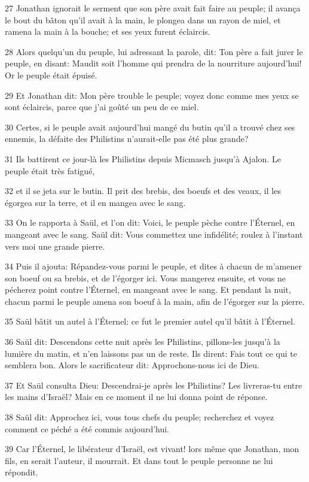 \par 27 Jonathan ignorait le serment que son père avait fait faire au peuple; il avança le bout du bâton qu'il avait à la main, le plongea dans un rayon de miel, et ramena la main à la bouche; et ses yeux furent éclaircis.
\par 28 Alors quelqu'un du peuple, lui adressant la parole, dit: Ton père a fait jurer le peuple, en disant: Maudit soit l'homme qui prendra de la nourriture aujourd'hui! Or le peuple était épuisé.
\par 29 Et Jonathan dit: Mon père trouble le peuple; voyez donc comme mes yeux se sont éclaircis, parce que j'ai goûté un peu de ce miel.
\par 30 Certes, si le peuple avait aujourd'hui mangé du butin qu'il a trouvé chez ses ennemis, la défaite des Philistins n'aurait-elle pas été plus grande?
\par 31 Ils battirent ce jour-là les Philistins depuis Micmasch jusqu'à Ajalon. Le peuple était très fatigué,
\par 32 et il se jeta sur le butin. Il prit des brebis, des boeufs et des veaux, il les égorgea sur la terre, et il en mangea avec le sang.
\par 33 On le rapporta à Saül, et l'on dit: Voici, le peuple pèche contre l'Éternel, en mangeant avec le sang. Saül dit: Vous commettez une infidélité; roulez à l'instant vers moi une grande pierre.
\par 34 Puis il ajouta: Répandez-vous parmi le peuple, et dites à chacun de m'amener son boeuf ou sa brebis, et de l'égorger ici. Vous mangerez ensuite, et vous ne pécherez point contre l'Éternel, en mangeant avec le sang. Et pendant la nuit, chacun parmi le peuple amena son boeuf à la main, afin de l'égorger sur la pierre.
\par 35 Saül bâtit un autel à l'Éternel: ce fut le premier autel qu'il bâtit à l'Éternel.
\par 36 Saül dit: Descendons cette nuit après les Philistins, pillons-les jusqu'à la lumière du matin, et n'en laissons pas un de reste. Ils dirent: Fais tout ce qui te semblera bon. Alors le sacrificateur dit: Approchons-nous ici de Dieu.
\par 37 Et Saül consulta Dieu: Descendrai-je après les Philistins? Les livreras-tu entre les mains d'Israël? Mais en ce moment il ne lui donna point de réponse.
\par 38 Saül dit: Approchez ici, vous tous chefs du peuple; recherchez et voyez comment ce péché a été commis aujourd'hui.
\par 39 Car l'Éternel, le libérateur d'Israël, est vivant! lors même que Jonathan, mon fils, en serait l'auteur, il mourrait. Et dans tout le peuple personne ne lui répondit.
